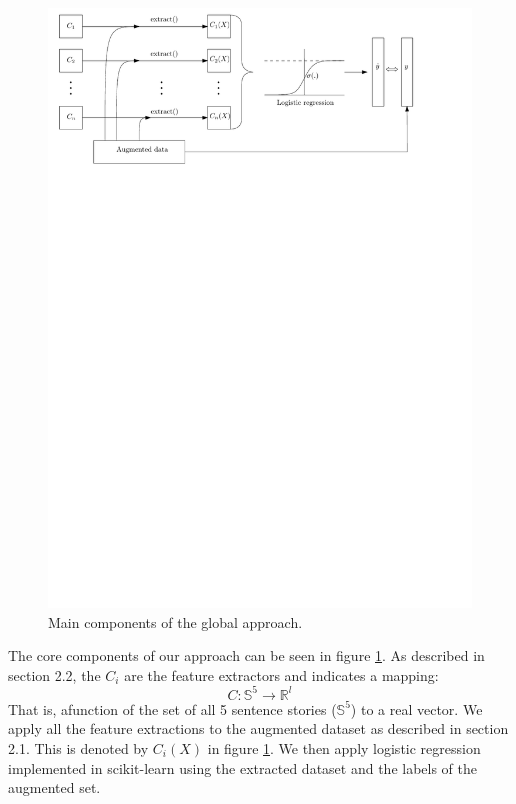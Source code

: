 \documentclass{article}
\begin{document}
	\begin{figure}[h!]
		\centering
		\includegraphics[scale=0.8]{fig/logistic_fitting.pdf}
		\caption{Main components of the global approach.}
		\label{Main}
	\end{figure}

The core components of our approach can be seen in figure \ref*{Main}. As described in section 2.2, the $C_i$ are the feature extractors and indicates a mapping:
\begin{equation}
C: \mathbb{S}^5 \rightarrow \mathbb{R}^l
\end{equation}
That is, afunction of the set of all 5 sentence stories ($\mathbb{S}^5$) to a real vector. We apply all the feature extractions to the augmented dataset as described in section 2.1. This is denoted by $C_i(X)$ in figure \ref*{Main}. We then apply logistic regression implemented in scikit-learn \cite{SKL} using the extracted dataset and the labels of the augmented set.
\end{document}
